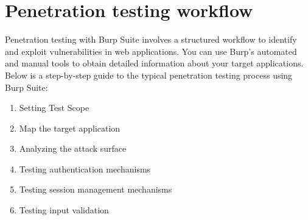 \documentclass[
	a4paper, %
	12pt, %
]{CSSullivanBusinessReport}
\begin{document}
\section*{Penetration testing workflow}

\begin{fullwidth}
    Penetration testing with Burp Suite involves a structured workflow to identify and exploit vulnerabilities in web applications. You can use Burp's automated and manual tools to obtain detailed information about your target applications. Below is a step-by-step guide to the typical penetration testing process using Burp Suite:
\end{fullwidth}

\begin{enumerate}

    \item Setting Test Scope 
    \item Map the target application
    \item Analyzing the attack surface
    \item Testing authentication mechanisms
    \item Testing session management mechanisms
    \item Testing input validation	
\end{enumerate}



\end{document}
